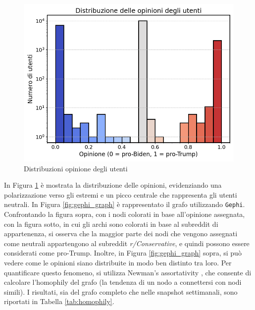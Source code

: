 \documentclass[sigchi]{acmart}
\begin{document}
\begin{figure}[h]
    \centering
    \includegraphics[width=\linewidth]{img/Distribuzione delle opinioni degli utenti.png}
    \caption{Distribuzioni opinione degli utenti} \label{fig:opinion_dist}
\end{figure}

In Figura \ref{fig:opinion_dist} è mostrata la distribuzione delle opinioni, evidenziando una polarizzazione verso gli estremi e un picco centrale che rappresenta gli utenti neutrali.
In Figura \ref{fig:gephi_graph} è rappresentato il grafo utilizzando \texttt{Gephi}. Confrontando la figura sopra, con i nodi colorati in base all'opinione assegnata, con la figura sotto, in cui gli archi sono colorati in base al subreddit di appartenenza, si osserva che la maggior parte dei nodi che vengono assegnati come neutrali appartengono al subreddit \textit{r/Conservative}, e quindi possono essere considerati come pro-Trump. 
Inoltre, in Figura \ref{fig:gephi_graph} sopra, si può vedere come le opinioni siano distribuite in modo ben distinto tra loro. Per quantificare questo fenomeno, si utilizza Newman's assortativity \cite{newman2003mixing}, che consente di calcolare l'homophily del grafo (la tendenza di un nodo a connettersi con nodi simili). I risultati, sia del grafo completo che nelle snapshot settimanali, sono riportati in Tabella \ref{tab:homophily}.

\begin{table}[ht]
    \centering
    \caption{Homophily rispetto all'opinione degli utenti}
    \label{tab:homophily}
\end{table}
\end{document}
